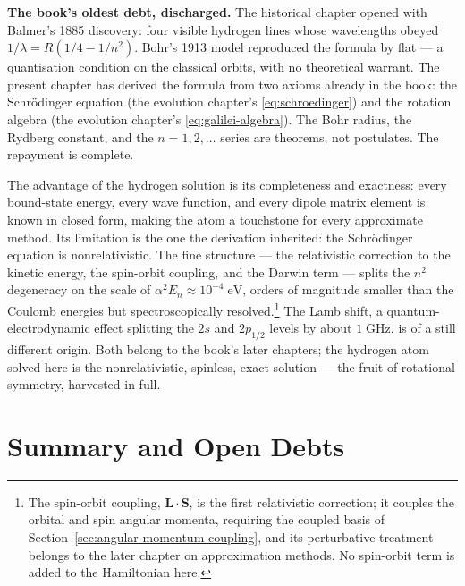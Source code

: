 \medskip\noindent\textbf{The book's oldest debt, discharged.} The historical chapter opened with Balmer's 1885 discovery: four visible hydrogen lines whose wavelengths obeyed $1/\lambda = R(1/4 - 1/n^2)$. Bohr's 1913 model reproduced the formula by flat --- a quantisation condition on the classical orbits, with no theoretical warrant. The present chapter has derived the formula from two axioms already in the book: the Schr\"odinger equation (the evolution chapter's \eqref{eq:schroedinger}) and the rotation algebra (the evolution chapter's \eqref{eq:galilei-algebra}). The Bohr radius, the Rydberg constant, and the $n=1,2,\ldots$ series are theorems, not postulates. The repayment is complete.

The advantage of the hydrogen solution is its completeness and exactness: every bound-state energy, every wave function, and every dipole matrix element is known in closed form, making the atom a touchstone for every approximate method. Its limitation is the one the derivation inherited: the Schr\"odinger equation is nonrelativistic. The fine structure --- the relativistic correction to the kinetic energy, the spin-orbit coupling, and the Darwin term --- splits the $n^2$ degeneracy on the scale of $\alpha^2 E_n \approx 10^{-4}\;\text{eV}$, orders of magnitude smaller than the Coulomb energies but spectroscopically resolved.\footnote{The spin-orbit coupling, $\bm L\cdot\bm S$, is the first relativistic correction; it couples the orbital and spin angular momenta, requiring the coupled basis of Section~\ref{sec:angular-momentum-coupling}, and its perturbative treatment belongs to the later chapter on approximation methods. No spin-orbit term is added to the Hamiltonian here.} The Lamb shift, a quantum-electrodynamic effect splitting the $2s$ and $2p_{1/2}$ levels by about $1\;\text{GHz}$, is of a still different origin. Both belong to the book's later chapters; the hydrogen atom solved here is the nonrelativistic, spinless, exact solution --- the fruit of rotational symmetry, harvested in full.

\section{Summary and Open Debts}
\label{sec:ch6summary}

